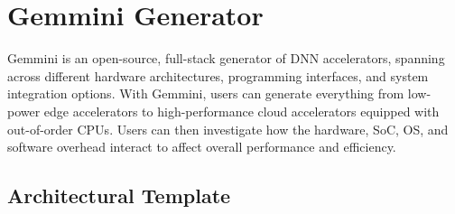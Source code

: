 \vspace{-0.01in}
\section{Gemmini Generator}\label{sec:generator}


Gemmini is an open-source, full-stack generator of DNN accelerators, spanning across different hardware architectures, programming interfaces, and system integration options.
With Gemmini, users can generate everything from low-power edge accelerators to high-performance cloud accelerators equipped with out-of-order CPUs. Users can then investigate how the hardware, SoC, OS, and software overhead interact to affect overall performance and efficiency.

\subsection{Architectural Template}
\label{ssec:arch}

